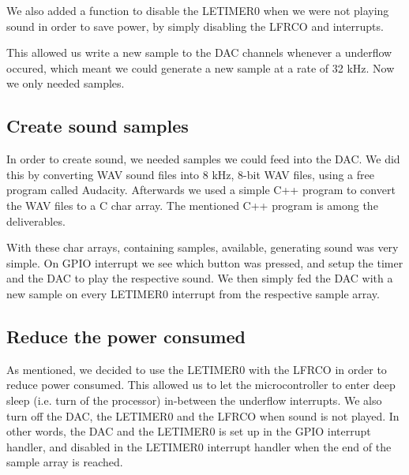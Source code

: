 We also added a function to disable the LETIMER0 when we were not playing sound in order to save power, by simply disabling the LFRCO and interrupts. 

This allowed us write a new sample to the DAC channels whenever a underflow occured, which meant we could generate a new sample at a rate of 32 kHz. Now we only needed samples.


\subsection{Create sound samples}

In order to create sound, we needed samples we could feed into the DAC. We did this by converting WAV sound files into 8 kHz, 8-bit WAV files, using a free program called Audacity\cite{audacity}. Afterwards we used a simple C++ program\cite{darkfader} to convert the WAV files to a C char array. The mentioned C++ program is among the deliverables. 

With these char arrays, containing samples, available, generating sound was very simple. On GPIO interrupt we see which button was pressed, and setup the timer and the DAC to play the respective sound. We then simply fed the DAC with a new sample on every LETIMER0 interrupt from the respective sample array. 

\subsection{Reduce the power consumed}

As mentioned, we decided to use the LETIMER0 with the LFRCO in order to reduce power consumed. This allowed us to let the microcontroller to enter deep sleep (i.e. turn of the processor) in-between the underflow interrupts. We also turn off the DAC, the LETIMER0 and the LFRCO when sound is not played. In other words, the DAC and the LETIMER0 is set up in the GPIO interrupt handler, and disabled in the LETIMER0 interrupt handler when the end of the sample array is reached. 




